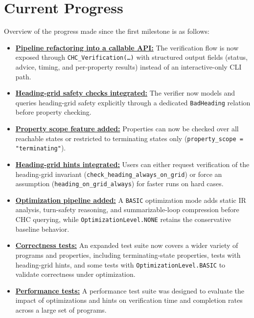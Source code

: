 \section*{Current Progress}

Overview of the progress made since the first milestone is as follows:

\begin{itemize}[leftmargin=1.5em]
	\item \hyperref[subsec:callable_api]{\textbf{Pipeline refactoring into a callable API:}}
	The verification flow is now exposed through \texttt{CHC\_Verification(\ldots)}
	with structured output fields (status, advice, timing, and per-property results)
	instead of an interactive-only CLI path.

	\item \hyperref[subsec:heading_grid_safety]{\textbf{Heading-grid safety checks integrated:}}
	The verifier now models and queries heading-grid safety explicitly through
	a dedicated \texttt{BadHeading} relation before property checking.

	\item \hyperref[subsec:property_scope]{\textbf{Property scope feature added:}}
	Properties can now be checked over all reachable states or restricted to
	terminating states only (\texttt{property\_scope = "terminating"}).

	\item \hyperref[subsec:heading_grid_hints]{\textbf{Heading-grid hints integrated:}}
	Users can either request verification of the heading-grid invariant
	(\texttt{check\_heading\_always\_on\_grid}) or force an assumption
	(\texttt{heading\_on\_grid\_always}) for faster runs on hard cases.

	\item \hyperref[subsec:opt_pipeline]{\textbf{Optimization pipeline added:}}
	A \texttt{BASIC} optimization mode adds static IR analysis, turn-safety reasoning,
	and summarizable-loop compression before CHC querying, while
	\texttt{OptimizationLevel.NONE} retains the conservative baseline behavior.

	\item \hyperref[subsec:correctness_tests]{\textbf{Correctness tests:}}
	An expanded test suite now covers a wider variety of programs and properties, 
	including terminating-state properties, tests with heading-grid hints, and 
	some tests with \texttt{OptimizationLevel.BASIC} to validate correctness under optimization.

	\item \hyperref[sec:performance_tests]{\textbf{Performance tests:}} A performance test suite was designed to evaluate the impact of optimizations and hints on verification time and completion rates across a large set of programs.
\end{itemize}

